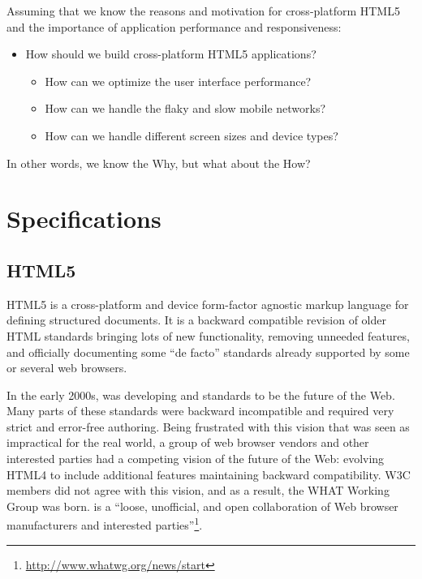 Assuming that we know the reasons and motivation for cross-platform
HTML5 and the importance of application performance and
responsiveness:

\begin{itemize}
\item How should we build cross-platform HTML5 applications?

  \begin{itemize}
  \item How can we optimize the user interface performance?
  \item How can we handle the flaky and slow mobile networks?
  \item How can we handle different screen sizes and device types?
  \end{itemize}
\end{itemize}

\noindent In other words, we know the Why, but what about the How?

\chapter{Specifications}
\label{chapter:specifications}

\section{HTML5}
\label{section:html5}

HTML5 is a cross-platform and device form-factor agnostic markup
language for defining structured documents. It is a backward
compatible revision of older HTML standards bringing lots of new
functionality, removing unneeded features, and officially documenting
some ``de facto'' standards already supported by some or several web
browsers. \cite{pilgrim2010html5}

In the early 2000s,  was developing  and
 standards to be the future of the Web. Many parts of
these standards were backward incompatible and required very strict
and error-free authoring. Being frustrated with this vision that was
seen as impractical for the real world, a group of web browser vendors
and other interested parties had a competing vision of the future of
the Web: evolving HTML4 to include additional features maintaining
backward compatibility. W3C members did not agree with this vision,
and as a result, the WHAT Working Group was born.  is a
``loose, unofficial, and open collaboration of Web browser
manufacturers and interested
parties''\footnote{\url{http://www.whatwg.org/news/start}}. \cite{pilgrim2010html5}

